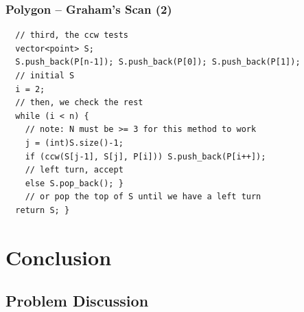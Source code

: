 \documentclass{beamer}
\begin{document}
\begin{frame}[fragile]
  \frametitle{Polygon -- Graham's Scan (2)}
  {\tiny
    \begin{exampleblock}{}

\begin{verbatim}
  // third, the ccw tests
  vector<point> S;
  S.push_back(P[n-1]); S.push_back(P[0]); S.push_back(P[1]);
  // initial S
  i = 2;
  // then, we check the rest
  while (i < n) {
    // note: N must be >= 3 for this method to work
    j = (int)S.size()-1;
    if (ccw(S[j-1], S[j], P[i])) S.push_back(P[i++]); 
    // left turn, accept
    else S.pop_back(); }
    // or pop the top of S until we have a left turn
  return S; }
\end{verbatim}
\end{exampleblock}}
\end{frame}


\section{Conclusion}

\subsection{Problem Discussion}

\end{document}
